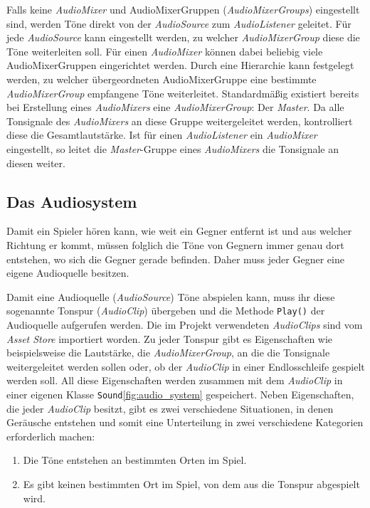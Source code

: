Falls keine \textit{AudioMixer} und AudioMixerGruppen (\textit{AudioMixerGroups}) eingestellt sind, werden Töne direkt von der \textit{AudioSource} zum \textit{AudioListener} geleitet. Für jede \textit{AudioSource} kann eingestellt werden, zu welcher \textit{AudioMixerGroup} diese die Töne weiterleiten soll. Für einen \textit{AudioMixer} können dabei beliebig viele AudioMixerGruppen eingerichtet werden. Durch eine Hierarchie kann festgelegt werden, zu welcher übergeordneten AudioMixerGruppe eine bestimmte \textit{AudioMixerGroup} empfangene Töne weiterleitet. Standardmäßig existiert bereits bei Erstellung eines \textit{AudioMixers} eine \textit{AudioMixerGroup}: Der \textit{Master}. Da alle Tonsignale des \textit{AudioMixers} an diese Gruppe weitergeleitet werden, kontrolliert diese die Gesamtlautstärke. Ist für einen \textit{AudioListener} ein \textit{AudioMixer} eingestellt, so leitet die \textit{Master}-Gruppe eines \textit{AudioMixers} die Tonsignale an diesen weiter.
 
\subsection{Das Audiosystem}\label{sec:audiosystem}
Damit ein Spieler hören kann, wie weit ein Gegner entfernt ist und aus welcher Richtung er kommt, müssen folglich die Töne von Gegnern immer genau dort entstehen, wo sich die Gegner gerade befinden. Daher muss jeder Gegner eine eigene Audioquelle besitzen.

Damit eine Audioquelle (\textit{AudioSource}) Töne abspielen kann, muss ihr diese sogenannte Tonspur (\textit{AudioClip}) übergeben und die Methode \texttt{Play()} der Audioquelle aufgerufen werden. Die im Projekt verwendeten \textit{AudioClips}\cite{KompositeSoundCaesarBostonProfiDevelopers.2019} sind vom \textit{Asset Store}\cite{Unity_Doc_Assets_Bib} importiert worden. Zu jeder Tonspur gibt es Eigenschaften wie beispielsweise die Lautstärke, die \textit{AudioMixerGroup}, an die die Tonsignale weitergeleitet werden sollen oder, ob der \textit{AudioClip} in einer Endlosschleife gespielt werden soll. All diese Eigenschaften werden zusammen mit dem \textit{AudioClip} in einer eigenen Klasse \texttt{Sound}\ref{fig:audio_system} gespeichert. Neben Eigenschaften, die jeder \textit{AudioClip} besitzt, gibt es zwei verschiedene Situationen, in denen Geräusche entstehen und somit eine Unterteilung in zwei verschiedene Kategorien erforderlich machen: 

\begin{enumerate}
	\item Die Töne entstehen an bestimmten Orten im Spiel.
	\item Es gibt keinen bestimmten Ort im Spiel, von dem aus die Tonspur abgespielt wird.
\end{enumerate}

